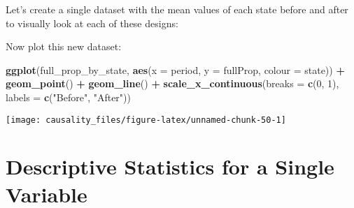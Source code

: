 \documentclass[]{book}
\newenvironment{Shaded}{\begin{snugshade}}{\end{snugshade}}
\newcommand{\CommentTok}[1]{\textcolor[rgb]{0.56,0.35,0.01}{\textit{#1}}}
\newcommand{\DataTypeTok}[1]{\textcolor[rgb]{0.13,0.29,0.53}{#1}}
\newcommand{\DecValTok}[1]{\textcolor[rgb]{0.00,0.00,0.81}{#1}}
\newcommand{\KeywordTok}[1]{\textcolor[rgb]{0.13,0.29,0.53}{\textbf{#1}}}
\newcommand{\NormalTok}[1]{#1}
\newcommand{\OperatorTok}[1]{\textcolor[rgb]{0.81,0.36,0.00}{\textbf{#1}}}
\newcommand{\StringTok}[1]{\textcolor[rgb]{0.31,0.60,0.02}{#1}}
\theoremstyle{definition}
\theoremstyle{definition}
\theoremstyle{definition}
\theoremstyle{remark}
\begin{document}
Let's create a single dataset with the mean values of each state before
and after to visually look at each of these designs:

\begin{Shaded}
\end{Shaded}

Now plot this new dataset:

\begin{Shaded}
\begin{Highlighting}[]
\KeywordTok{ggplot}\NormalTok{(full_prop_by_state, }\KeywordTok{aes}\NormalTok{(}\DataTypeTok{x =}\NormalTok{ period, }\DataTypeTok{y =}\NormalTok{ fullProp, }\DataTypeTok{colour =}\NormalTok{ state)) }\OperatorTok{+}
\StringTok{  }\KeywordTok{geom_point}\NormalTok{() }\OperatorTok{+}
\StringTok{  }\KeywordTok{geom_line}\NormalTok{() }\OperatorTok{+}
\StringTok{  }\KeywordTok{scale_x_continuous}\NormalTok{(}\DataTypeTok{breaks =} \KeywordTok{c}\NormalTok{(}\DecValTok{0}\NormalTok{, }\DecValTok{1}\NormalTok{), }\DataTypeTok{labels =} \KeywordTok{c}\NormalTok{(}\StringTok{"Before"}\NormalTok{, }\StringTok{"After"}\NormalTok{))}
\end{Highlighting}
\end{Shaded}

\begin{center}\texttt{[image: causality\_files/figure-latex/unnamed-chunk-50-1]} \end{center}

\hypertarget{descriptive-statistics-for-a-single-variable}{%
\section{Descriptive Statistics for a Single
Variable}\label{descriptive-statistics-for-a-single-variable}}
\end{document}
